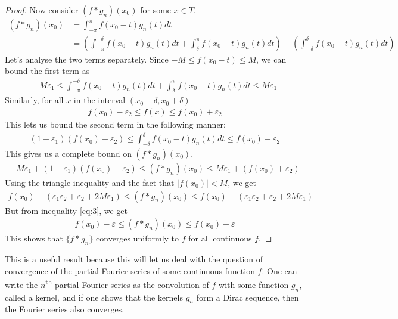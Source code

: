 \documentclass[12pt, titlepage]{article}
\theoremstyle{definition}
\newcommand{\vep}{\varepsilon}
\begin{document}
\begin{proof}
    Now consider $(f \ast g_n)(x_0)$ for some $x \in T$.
    \begin{align*}
        (f \ast g_n)(x_0) &= \int_{-\pi}^{\pi} f(x_0-t) g_n(t) dt \\
        &= \left( \int_{-\pi}^{-\delta} f(x_0-t) g_n(t) dt + \int_{\delta}^{\pi} f(x_0-t) g_n(t) dt \right) + \left( \int_{-\delta}^{\delta} f(x_0-t) g_n(t) dt \right)
    \end{align*}
    Let's analyse the two terms separately. Since $-M \leq f(x_0-t) \leq M$, we can bound the first term as
    \begin{align*}
        -M\vep_1 \leq \int_{-\pi}^{-\delta} f(x_0-t) g_n(t) dt + \int_{\delta}^{\pi} f(x_0-t) g_n(t) dt \leq M\vep_1
    \end{align*}
    Similarly, for all $x$ in the interval $(x_0 -\delta, x_0 + \delta)$
    \begin{align*}
        f(x_0) - \vep_2 \leq f(x) \leq f(x_0) + \vep_2
    \end{align*}
    This lets us bound the second term in the following manner:
    \begin{align*}
        (1- \vep_1)(f(x_0) - \vep_2) \leq \int_{-\delta}^{\delta} f(x_0 - t)g_n(t) dt \leq f(x_0) + \vep_2
    \end{align*}
    This gives us a complete bound on $(f \ast g_n)(x_0)$.
    \begin{align*}
        -M\vep_1 + (1 - \vep_1)(f(x_0) - \vep_2) \leq (f \ast g_n)(x_0) \leq M\vep_1 + (f(x_0) + \vep_2)
    \end{align*}
    Using the triangle inequality and the fact that $|f(x_0)| < M$, we get
    \begin{align*}
        f(x_0) - (\vep_1 \vep_2 + \vep_2 + 2M\vep_1) \leq (f \ast g_n)(x_0) \leq f(x_0) + (\vep_1 \vep_2 + \vep_2 + 2M\vep_1)
    \end{align*}
    But from inequality \ref{eq:3}, we get
    \begin{align*}
        f(x_0) - \vep \leq (f \ast g_n)(x_0) \leq f(x_0) + \vep
    \end{align*}
    This shows that $\{f \ast g_n\}$ converges uniformly to $f$ for all continuous $f$.
\end{proof}

This is a useful result because this will let us deal with the question of convergence of the partial Fourier series of some continuous function $f$. One can write the $n$\textsuperscript{th} partial Fourier series as the convolution of $f$ with some function $g_n$, called a kernel, and if one shows that the kernels $g_n$ form a Dirac sequence, then the Fourier series also converges.
\end{document}
